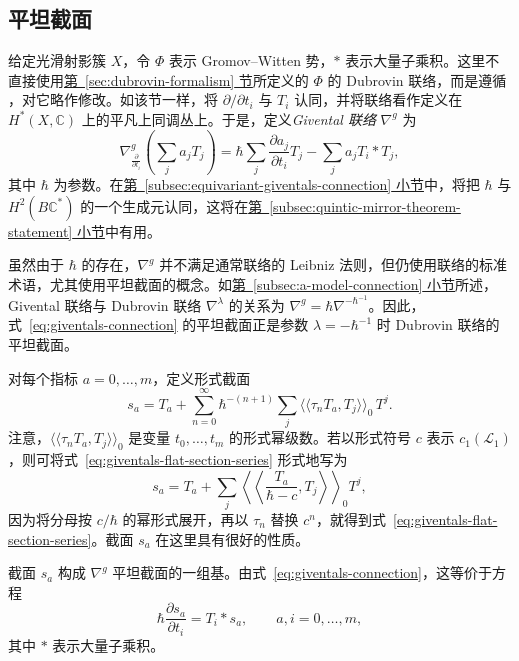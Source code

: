 \subsection{平坦截面}\label{subsec:giventals-flat-sections}
给定光滑射影簇 $X$，令 $\Phi$ 表示 Gromov--Witten 势，$*$ 表示大量子乘积。这里不直接使用\hyperref[sec:dubrovin-formalism]{第~\ref*{sec:dubrovin-formalism} 节}所定义的 $\Phi$ 的 Dubrovin 联络，而是遵循 ，对它略作修改。如该节一样，将 $\partial/\partial t_i$ 与 $T_i$ 认同，并将联络看作定义在 $H^*(X,\mathbb C)$ 上的平凡上同调丛上。于是，定义\emph{Givental 联络} $\nabla^g$ 为
\begin{equation}\label{eq:giventals-connection}
\nabla^g_{\frac{\partial}{\partial t_i}}\left(\sum_j a_jT_j\right)
=\hbar\sum_j\frac{\partial a_j}{\partial t_i}T_j
-\sum_j a_jT_i*T_j,
\end{equation}
其中 $\hbar$ 为参数。在\hyperref[subsec:equivariant-giventals-connection]{第~\ref*{subsec:equivariant-giventals-connection} 小节}中，将把 $\hbar$ 与 $H^2(B\mathbb C^*)$ 的一个生成元认同，这将在\hyperref[subsec:quintic-mirror-theorem-statement]{第~\ref*{subsec:quintic-mirror-theorem-statement} 小节}中有用。

虽然由于 $\hbar$ 的存在，$\nabla^g$ 并不满足通常联络的 Leibniz 法则，但仍使用联络的标准术语，尤其使用平坦截面的概念。如\hyperref[subsec:a-model-connection]{第~\ref*{subsec:a-model-connection} 小节}所述，Givental 联络与 Dubrovin 联络 $\nabla^\lambda$ 的关系为
$\nabla^g=\hbar\nabla^{-\hbar^{-1}}$。因此，式~\eqref{eq:giventals-connection} 的平坦截面正是参数 $\lambda=-\hbar^{-1}$ 时 Dubrovin 联络的平坦截面。

对每个指标 $a=0,\ldots,m$，定义形式截面
\begin{equation}\label{eq:giventals-flat-section-series}
s_a=T_a+\sum_{n=0}^{\infty}\hbar^{-(n+1)}\sum_j
\langle\!\langle\tau_nT_a,T_j\rangle\!\rangle_0\,T^j.
\end{equation}
注意，$\langle\!\langle\tau_nT_a,T_j\rangle\!\rangle_0$ 是变量 $t_0,\ldots,t_m$ 的形式幂级数。若以形式符号 $c$ 表示 $c_1(\mathcal L_1)$，则可将式~\eqref{eq:giventals-flat-section-series} 形式地写为
\begin{equation}\label{eq:giventals-flat-section-symbolic}
s_a=T_a+\sum_j\left\langle\!\left\langle\frac{T_a}{\hbar-c},T_j\right\rangle\!\right\rangle_0T^j,
\end{equation}
因为将分母按 $c/\hbar$ 的幂形式展开，再以 $\tau_n$ 替换 $c^n$，就得到式~\eqref{eq:giventals-flat-section-series}。截面 $s_a$ 在这里具有很好的性质。
\begin{proposition}\label{prop:giventals-flat-sections}
截面 $s_a$ 构成 $\nabla^g$ 平坦截面的一组基。由式~\eqref{eq:giventals-connection}，这等价于方程
\[
\hbar\frac{\partial s_a}{\partial t_i}=T_i*s_a,
\qquad a,i=0,\ldots,m,
\]
其中 $*$ 表示大量子乘积。
\end{proposition}

